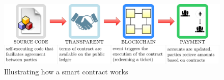 	\begin{warpHTML}
	\begin{figure}[ht]
		\centering
		\includegraphics[width=1\linewidth]{Diagrams/smartContractsExp.svg}
		\caption{Illustrating how a smart contract works}
		\label{fig:smartContracts}
	\end{figure}
	\end{warpHTML}
	\newpage